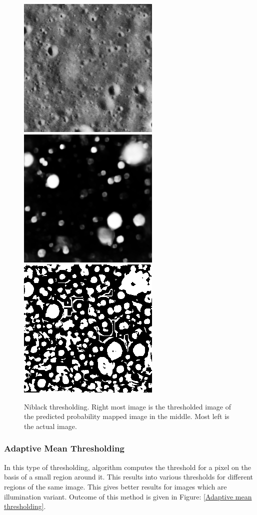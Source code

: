 \documentclass[11pt]{article}
\begin{document}
\begin{figure}[H]
	\includegraphics[width=.3\textwidth]{files/results/26.png}\hfill
	\includegraphics[width=.3\textwidth]{files/results/26_predict.png}\hfill
	\includegraphics[width=.3\textwidth]{files/results/niblack.png}
	\caption{Niblack thresholding. Right most image is the thresholded image of the predicted probability mapped image in the middle. Most left is the actual image.}
	\label{Niblack_th}
\end{figure}

\subsubsection{Adaptive Mean Thresholding}
In this type of thresholding, algorithm computes the threshold for a pixel on the basis of a small region around it. This results into various thresholds for different regions of the same image. This gives better results for images which are illumination variant. Outcome of this method is given in Figure: \ref{Adaptive mean thresholding}.
\end{document}
